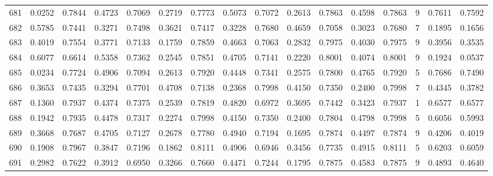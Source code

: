 \begin{tabular}{lrrrrrrrrrrrrrrr}
681 &      0.0252 &  0.7844 &  0.4723 &  0.7069 &  0.2719 &  0.7773 &  0.5073 &  0.7072 &  0.2613 &  0.7863 &   0.4598 &     0.7863 &      9 &                    0.7611 &                     0.7592 \\
682 &      0.5785 &  0.7441 &  0.3271 &  0.7498 &  0.3621 &  0.7417 &  0.3228 &  0.7680 &  0.4659 &  0.7058 &   0.3023 &     0.7680 &      7 &                    0.1895 &                     0.1656 \\
683 &      0.4019 &  0.7554 &  0.3771 &  0.7133 &  0.1759 &  0.7859 &  0.4663 &  0.7063 &  0.2832 &  0.7975 &   0.4030 &     0.7975 &      9 &                    0.3956 &                     0.3535 \\
684 &      0.6077 &  0.6614 &  0.5358 &  0.7362 &  0.2545 &  0.7851 &  0.4705 &  0.7141 &  0.2220 &  0.8001 &   0.4074 &     0.8001 &      9 &                    0.1924 &                     0.0537 \\
685 &      0.0234 &  0.7724 &  0.4906 &  0.7094 &  0.2613 &  0.7920 &  0.4448 &  0.7341 &  0.2575 &  0.7800 &   0.4765 &     0.7920 &      5 &                    0.7686 &                     0.7490 \\
686 &      0.3653 &  0.7435 &  0.3294 &  0.7701 &  0.4708 &  0.7138 &  0.2368 &  0.7998 &  0.4150 &  0.7350 &   0.2400 &     0.7998 &      7 &                    0.4345 &                     0.3782 \\
687 &      0.1360 &  0.7937 &  0.4374 &  0.7375 &  0.2539 &  0.7819 &  0.4820 &  0.6972 &  0.3695 &  0.7442 &   0.3423 &     0.7937 &      1 &                    0.6577 &                     0.6577 \\
688 &      0.1942 &  0.7935 &  0.4478 &  0.7317 &  0.2274 &  0.7998 &  0.4150 &  0.7350 &  0.2400 &  0.7804 &   0.4798 &     0.7998 &      5 &                    0.6056 &                     0.5993 \\
689 &      0.3668 &  0.7687 &  0.4705 &  0.7127 &  0.2678 &  0.7780 &  0.4940 &  0.7194 &  0.1695 &  0.7874 &   0.4497 &     0.7874 &      9 &                    0.4206 &                     0.4019 \\
690 &      0.1908 &  0.7967 &  0.3847 &  0.7196 &  0.1862 &  0.8111 &  0.4906 &  0.6946 &  0.3456 &  0.7735 &   0.4915 &     0.8111 &      5 &                    0.6203 &                     0.6059 \\
691 &      0.2982 &  0.7622 &  0.3912 &  0.6950 &  0.3266 &  0.7660 &  0.4471 &  0.7244 &  0.1795 &  0.7875 &   0.4583 &     0.7875 &      9 &                    0.4893 &                     0.4640 \\

\end{tabular}

